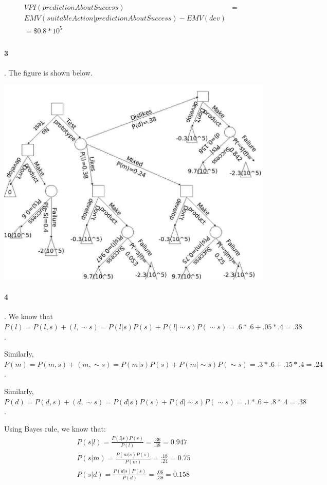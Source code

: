 \documentclass[10pt]{article}
\begin{document}
\begin{eqnarray}
VPI(predictionAboutSuccess)&=&\\
EMV(suitableAction|predictionAboutSuccess)-EMV(dev)& &\\
=\$0.8*10^{5}& &\\
\end{eqnarray}


   \paragraph{3}. The figure is shown below.
\begin{center}
 \includegraphics[scale=0.25]{decisionTree.jpg}
\end{center}

   \paragraph{4}. We know that $P(l) = P(l,s)+(l,\sim s) = P(l|s)P(s)+P(l|\sim s)P(\sim s)=.6*.6+.05*.4=.38$.

Similarly, $P(m)=P(m,s)+(m,\sim s)=P(m|s)P(s)+P(m|\sim s)P(\sim s)=.3*.6+.15*.4=.24$.

Similarly, $P(d)=P(d,s)+(d,\sim s)=P(d|s)P(s)+P(d|\sim s)P(\sim s)=.1*.6+.8*.4=.38$.

Using Bayes rule, we know that:
\begin{eqnarray}
P(s|l)=\frac{P(l|s)P(s)}{P(l)}=\frac{.36}{.38}=0.947\\
P(s|m)=\frac{P(m|s)P(s)}{P(m)}=\frac{.18}{.24}=0.75\\
P(s|d)=\frac{P(d|s)P(s)}{P(d)}=\frac{.06}{.38}=0.158\\
\end{eqnarray}
\end{document}
